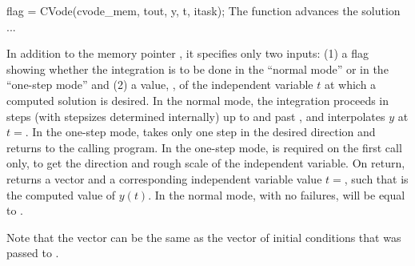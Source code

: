 {
  flag = CVode(cvode\_mem, tout, y, t, itask);
}
{
  The function  advances the solution ...
}
{
In addition to the {\cvodes} memory pointer , it specifies only two
inputs: (1) a flag  showing whether the integration is to be done in
the ``normal mode'' or in the ``one-step mode'' and (2) a value,
, of the independent variable $t$ at which a computed
solution is desired.  In the normal mode, the integration proceeds in
steps (with stepsizes determined internally) up to and past ,
and  interpolates $y$ at $t = $. In the one-step
mode,  takes only one step in the desired direction and
returns to the calling program.  In the one-step mode,  is
required on the first call only, to get the direction and rough scale
of the independent variable.  On return,  returns a vector
 and a corresponding independent variable value
$t=$, such that  is the computed value of $y(t)$.
In the normal mode, with no failures,  will be equal to
.

Note that the vector  can be the same as the  vector of 
initial conditions that was passed to . 
}
